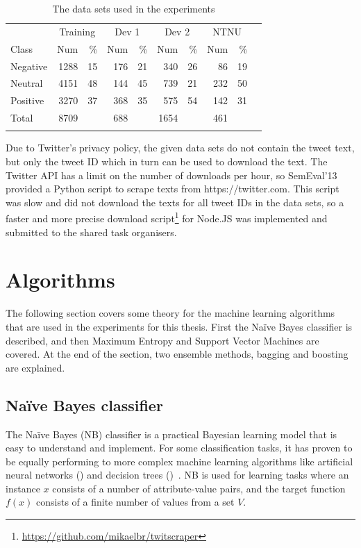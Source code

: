 \begin{table}[htb!]
\centering
\begin{tabular}{l|rrrrrrrrr}
\noalign{\smallskip}\hline\noalign{\smallskip}
& \multicolumn{2}{c}{Training} & \multicolumn{2}{c}{Dev 1} &\multicolumn{2}{c}{Dev 2} &\multicolumn{2}{c}{NTNU}  \\
Class & Num & \% & Num & \% & Num & \% & Num & \% \\

\noalign{\smallskip}\hline\noalign{\smallskip}
Negative & 1288 & 15 & 176 & 21 & 340 & 26 & 86 & 19\\
Neutral  & 4151 & 48 & 144 & 45 & 739 & 21 & 232 & 50 \\
Positive & 3270 & 37 & 368 & 35 & 575 & 54 & 142 & 31 \\ 
Total & 8709 && 688 && 1654 && 461 &\\ 
\noalign{\smallskip}\hline\noalign{\smallskip}
\end{tabular}
\caption{The data sets used in the experiments}
\label{tab:datasets}
\end{table}

Due to Twitter's privacy policy, the given data sets do not contain the tweet text, but only the tweet ID which in turn can be used to download the text. The Twitter API has a limit on the number of downloads per hour, so SemEval'13 provided a Python script to scrape texts from https://twitter.com. This script was slow and did not download the texts for all tweet IDs in the data sets, so a faster and more precise download script\footnote{\url{https://github.com/mikaelbr/twitscraper}} for Node.JS was implemented and submitted to the shared task organisers.

\section{Algorithms}
The following section covers some theory for the machine learning algorithms that are used in the experiments for this thesis. First the Na\"{i}ve Bayes classifier is described, and then Maximum Entropy and Support Vector Machines are covered. At the end of the section, two ensemble methods, bagging and boosting are explained.

\subsection{Na\"{i}ve Bayes classifier}
The Na\"{i}ve Bayes (NB) classifier is a practical Bayesian learning model that is easy to understand and implement. For some classification tasks, it has proven to be equally performing to more complex machine learning algorithms like artificial neural networks () and decision trees ()~\citep{book:Mitchell}. NB is used for learning tasks where an instance $x$ consists of a number of attribute-value pairs, and the target function $f(x)$ consists of a finite number of values from a set $V$.

